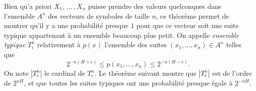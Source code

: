 Bien qu'a priori $X_1,\,\dots\,,X_n$ puisse prendre des
valeurs quelconques dans l'ensemble $A^n$ des vecteurs de
symboles de taille $n$, ce th\'eor\`eme permet de montrer
qu'il y a une probabilit\'e presque $1$ pour que ce vecteur soit
une suite typique appartenant \`a un ensemble beaucoup plus
petit. On appelle {\it ensemble typique} $T^n_\epsilon$
relativement \`a $p(x)$ l'ensemble des suites
$(x_1,...,x_n) \in A^n$ telles que
\begin{equation}
\label{Typique-def}
2^{-n (H+\epsilon)} \leq p(x_1,...,x_n) \leq
2^{-n (H-\epsilon)} .
\end{equation}
On note $|T^n_\epsilon|$ le cardinal de $T^n_\epsilon$.
Le th\'eor\`eme suivant montre que
$|T^n_\epsilon|$
est de l'ordre de $2^{nH}$, et que toutes les
suites typiques ont une probabilit\'e presque \'egale
\`a $2^{-nH}$.

